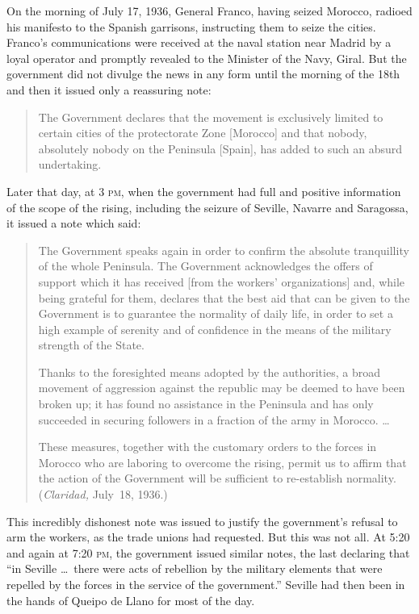 On the morning of July 17, 1936, General Franco{\indexFFranco}, having seized Morocco{}, radioed his manifesto to the Spanish garrisons, instructing them to seize the cities. Franco’s communications were received at the naval station near Madrid by a loyal operator and promptly revealed to the Minister of the Navy, Giral. But the government did not divulge the news in any form until the morning of the 18th and then it issued only a reassuring note:
\nowidow

\begin{quotation}
  The Government declares that the movement is exclusively limited to certain cities of the protectorate Zone [Morocco] and that nobody, absolutely nobody on the Peninsula [Spain], has added to such an absurd undertaking.
\end{quotation}

Later that day, at 3 \textsc{pm}, when the government had full and positive information of the scope of the rising, including the seizure of Seville, Navarre and Saragossa, it issued a note which said:

\begin{quotation}
  \begin{sloppypar}
  The Government speaks again in order to confirm the absolute tranquillity of the whole Peninsula. The Government acknowledges the offers of support which it has received [from the workers’ organizations] and, while being grateful for them, declares that the best aid that can be given to the Government is to guarantee the normality of daily life, in order to set a high example of serenity and of confidence in the means of the military strength of the State.
  \end{sloppypar}
  
  Thanks to the foresighted means adopted by the authorities, a broad movement of aggression against the republic may be deemed to have been broken up; it has found no assistance in the Peninsula and has only succeeded in securing followers in a fraction of the army in Morocco. \dots
  
  \indexClaridad
  These measures, together with the customary orders to the forces in Morocco who are laboring to overcome the rising, permit us to affirm that the action of the Government will be sufficient to re-establish normality. (\emph{Claridad,} July~18, 1936.)
\end{quotation}

This incredibly dishonest note was issued to justify the government’s refusal to arm the workers, as the trade unions had requested. But this was not all. At 5:20 and again at 7:20 \textsc{pm}, the government issued similar notes, the last declaring that ``in Seville \dots\ there were acts of rebellion by the military elements that were repelled by the forces in the service of the government.'' Seville had then been in the hands of Queipo de Llano for most of the day.

